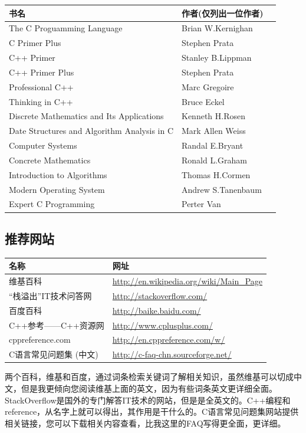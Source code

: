 \documentclass[11pt,twoside,a4paper,titlepage]{article}	%
\begin{document}
\noindent\begin{tabular}{lll}
\hline
书名&作者(仅列出一位作者) \\
\hline
The C Proguamming Language & Brian W.Kernighan \\
C Primer Plus & Stephen Prata \\
C++ Primer & Stanley B.Lippman \\
C++ Primer Plus & Stephen Prata \\
Professional C++ & Marc Gregoire \\
Thinking in C++ & Bruce Eckel \\
Discrete Mathematics and Its Applications & Kenneth H.Rosen \\
Date Structures and Algorithm Analysis in C & Mark Allen Weiss \\
Computer Systems & Randal E.Bryant \\
Concrete Mathematics & Ronald L.Graham \\
Introduction to Algorithms & Thomas H.Cormen \\
Modern Operating System & Andrew S.Tanenbaum \\
Expert C Programming & Perter Van \\
\hline
\end{tabular}

\subsection{推荐网站}
\begin{tabular}{ll}
\hline
名称 & 网址 \\
\hline
维基百科 & \url{http://en.wikipedia.org/wiki/Main_Page} \\
“栈溢出”IT技术问答网 & \url{http://stackoverflow.com/} \\
百度百科 & \url{http://baike.baidu.com/} \\
C++参考——C++资源网 & \url{http://www.cplusplus.com/} \\
cppreference.com & \url{http://en.cppreference.com/w/} \\
C语言常见问题集 (中文) & \url{http://c-faq-chn.sourceforge.net/} \\
\hline
\end{tabular}

两个百科，维基和百度，通过词条检索关键词了解相关知识，虽然维基可以切成中文，但是我更倾向您阅读维基上面的英文，因为有些词条英文更详细全面。StackOverflow是国外的专门解答IT技术的网站，但是是全英文的。C++编程和reference，从名字上就可以得出，其作用是干什么的。C语言常见问题集网站提供相关链接，您可以下载相关内容查看，比我这里的FAQ写得更全面，更详细。
\end{document}
